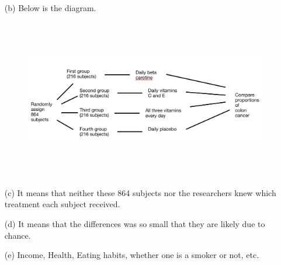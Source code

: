 \documentclass[11pt, a4paper]{article}
\begin{document}
\begin{itemize}
\begin{itemize}
\item[(b)]
Below is the diagram.
\begin{figure}[h]
    \centering
    \includegraphics[width=15cm, height=7cm]{diagram_1}
\end{figure}

\item[]

\item[(c)]
It means that neither these 864 subjects nor the researchers
knew which treatment each subject received.

\item[]

\item[(d)]
It means that the differences was so small that they are likely due to chance.

\item[]

\item[(e)]
Income, Health, Eating habits, whether one is a smoker or not, etc.
\end{itemize}

\end{itemize}
\end{document}
